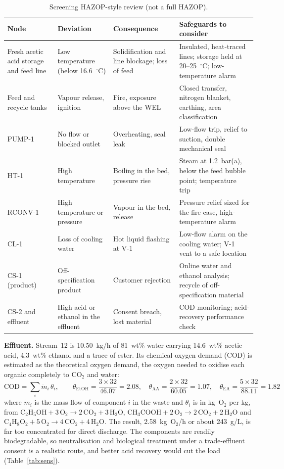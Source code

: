\documentclass[10pt,a4paper]{article}
\newcommand{\hdrrow}{}
\begin{document}
\begin{table}[H]
\centering
\caption{Screening HAZOP-style review (not a full HAZOP).}
\label{tab:hazop}
\small
\begin{tabularx}{\textwidth}{|L{2.7cm}|L{2.9cm}|L{3.2cm}|Y|}
\hline
\hdrrow
\textbf{Node} & \textbf{Deviation} & \textbf{Consequence} & \textbf{Safeguards to consider} \\
\hline
Fresh acetic acid storage and feed line & Low temperature (below 16.6~$^\circ$C) & Solidification and line blockage; loss of feed & Insulated, heat-traced lines; storage held at 20--25~$^\circ$C; low-temperature alarm \\
\hline
Feed and recycle tanks & Vapour release, ignition & Fire, exposure above the WEL & Closed transfer, nitrogen blanket, earthing, area classification \\
\hline
PUMP-1 & No flow or blocked outlet & Overheating, seal leak & Low-flow trip, relief to suction, double mechanical seal \\
\hline
HT-1 & High temperature & Boiling in the bed, pressure rise & Steam at 1.2~bar(a), below the feed bubble point; temperature trip \\
\hline
RCONV-1 & High temperature or pressure & Vapour in the bed, release & Pressure relief sized for the fire case, high-temperature alarm \\
\hline
CL-1 & Loss of cooling water & Hot liquid flashing at V-1 & Low-flow alarm on the cooling water; V-1 vent to a safe location \\
\hline
CS-1 (product) & Off-specification product & Customer rejection & Online water and ethanol analysis; recycle of off-specification material \\
\hline
CS-2 and effluent & High acid or ethanol in the effluent & Consent breach, lost material & COD monitoring; acid-recovery performance check \\
\hline
\end{tabularx}
\end{table}

\textbf{Effluent.} Stream~12 is 10.50~kg/h of 81~wt\% water carrying 14.6~wt\% acetic acid, 4.3~wt\% ethanol and a trace of ester. Its chemical oxygen demand (COD) is estimated as the theoretical oxygen demand, the oxygen needed to oxidise each organic completely to $\mathrm{CO_2}$ and water:
\begin{equation}
\mathrm{COD} = \sum_i \dot{m}_i\,\theta_i, \qquad
\theta_{\mathrm{EtOH}} = \frac{3 \times 32}{46.07} = 2.08, \quad
\theta_{\mathrm{AA}} = \frac{2 \times 32}{60.05} = 1.07, \quad
\theta_{\mathrm{EA}} = \frac{5 \times 32}{88.11} = 1.82
\label{eq:cod}
\end{equation}
where $\dot{m}_i$ is the mass flow of component $i$ in the waste and $\theta_i$ is in kg~O$_2$ per kg, from $\mathrm{C_2H_5OH + 3\,O_2 \to 2\,CO_2 + 3\,H_2O}$, $\mathrm{CH_3COOH + 2\,O_2 \to 2\,CO_2 + 2\,H_2O}$ and $\mathrm{C_4H_8O_2 + 5\,O_2 \to 4\,CO_2 + 4\,H_2O}$. The result, 2.58~kg~O$_2$/h or about 243~g/L, is far too concentrated for direct discharge. The components are readily biodegradable, so neutralisation and biological treatment under a trade-effluent consent is a realistic route, and better acid recovery would cut the load (Table~\ref{tab:sens}).
\end{document}
